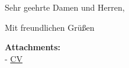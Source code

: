 \begin{coverletter}

    \displayCompanyAdress

    \vspace{10pt}

    \displaySubject

    \vspace{10pt}

    Sehr geehrte Damen und Herren,

    \vspace{10pt}

    \lipsum[1-3]

    \vspace{10pt}

    Mit freundlichen Grüßen
    \displaysignature

    \vfill
    \textbf{Attachments:}\\
    \-- \hyperref[cvPage.2]{CV}

\end{coverletter}
